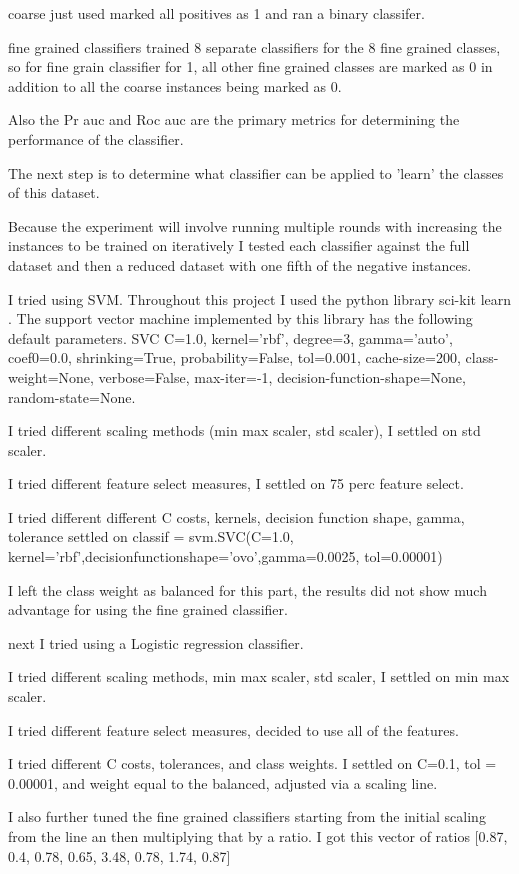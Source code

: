 \documentclass[ms]{nuthesis}
\begin{document}
\par coarse just used marked all positives as 1 and ran a binary classifer.
\par fine grained classifiers trained 8 separate classifiers for the 8 fine grained
classes, so for fine grain classifier for 1, all other fine grained classes are marked as 0
in addition to all the coarse instances being marked as 0.
\par Also the Pr auc and Roc auc are the primary metrics for determining the performance
of the classifier.
\par The next step is to determine what classifier can be applied to 'learn' the classes of
this dataset.
\par Because the experiment will involve running multiple rounds with increasing the instances to
 be trained on iteratively I tested each classifier against the full dataset and then a reduced
 dataset with one fifth of the negative instances.



\par I tried using SVM. Throughout this project I used the python library sci-kit learn \cite{scikit-learn}.
The support vector machine implemented by this library has the following default parameters. SVC C=1.0,
kernel='rbf', degree=3, gamma='auto', coef0=0.0, shrinking=True, probability=False, tol=0.001, cache-size=200,
class-weight=None, verbose=False, max-iter=-1, decision-function-shape=None, random-state=None.
\par I tried different scaling methods (min max scaler, std scaler), I settled on std scaler.



\par I tried different feature select measures, I settled on 75 perc feature select.



\par I tried different different C costs, kernels, decision function shape, gamma, tolerance
settled on classif = svm.SVC(C=1.0, kernel='rbf',decisionfunctionshape='ovo',gamma=0.0025,
 tol=0.00001)



\par I left the class weight as balanced for this part, the results did not show much advantage
for using the fine grained classifier.


\par next I tried using a Logistic regression classifier.
\par I tried different scaling methods, min max scaler, std scaler, I settled on min max scaler.
\par I tried different feature select measures, decided to use all of the features.
\par I tried different C costs, tolerances, and class weights. I settled on C=0.1, tol = 0.00001,
and weight equal to the balanced, adjusted via a scaling line.
\par I also further tuned the fine grained classifiers starting from the initial scaling from the
line an then multiplying that by a ratio.
I got this vector of ratios
[0.87, 0.4, 0.78, 0.65, 3.48, 0.78, 1.74, 0.87]
\end{document}
